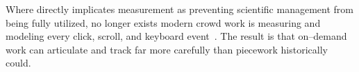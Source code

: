 \documentclass[trackingWork]{subfiles}
\begin{document}




\subsubsection{\whatchanged}
\begin{comment}
outline
	- measurement is more precise,
  so decomposition is deeper
	- not a single position,
  but a marketplace
\end{comment}

Where \citeauthor{10.2307/23702539} directly implicates measurement as
preventing scientific management from being fully utilized,
no longer exists
modern crowd work is measuring and modeling every click,
scroll,
and keyboard event~\cite{rzeszotarski2011instrumenting,rzeszotarski2012crowdscape}.
The result is that on--demand work can articulate and track far more carefully than piecework historically could.
\end{document}
